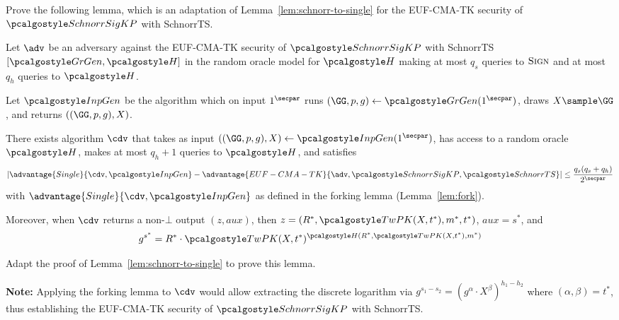 \begin{exercise}\label{ex:schnorrkp-to-single}
  Prove the following lemma, which is an adaptation of Lemma~\ref{lem:schnorr-to-single} for the EUF-CMA-TK security of $\algo{SchnorrSigKP}$ with SchnorrTS.
  
  \begin{lemma}\label{lem:schnorrkp-to-single}
    Let $\adv$ be an adversary against the EUF-CMA-TK security of $\algo{SchnorrSigKP}$ with SchnorrTS$[\grgen, \algo{H}]$ in the random oracle model for $\algo{H}$ making at most $q_s$ queries to ${\normalfont\textsc{Sign}}$ and at most $q_h$ queries to $\algo{H}$.
    
    Let $\algo{InpGen}$ be the algorithm which on input $1^\secpar$ runs $(\GG, p, g) \gets \grgen(1^\secpar)$, draws $X \sample \GG$, and returns $((\GG, p, g), X)$.
    
    There exists algorithm $\cdv$ that takes as input $(\gparam, X) \gets \algo{InpGen}(1^\secpar)$, has access to a random oracle $\algo{H}$, makes at most $q_h + 1$ queries to $\algo{H}$, and satisfies
    \[
      \left|\advantage{Single}{\cdv, \algo{InpGen}} - \advantage{EUF-CMA-TK}{\adv, \algo{SchnorrSigKP}, \algo{SchnorrTS}}\right| \leq \frac{q_s(q_s + q_h)}{2^\secpar}
    \]
    with $\advantage{Single}{\cdv, \algo{InpGen}}$ as defined in the forking lemma (Lemma~\ref{lem:fork}).
    
    Moreover, when $\cdv$ returns a non-$\bot$ output $(z, \mathit{aux})$, then $z = (R^*, \algo{TwPK}(X, t^*), m^*, t^*)$, $\mathit{aux} = s^*$, and
    \[
      g^{s^*} = R^* \cdot \algo{TwPK}(X, t^*)^{\algo{H}(R^*, \algo{TwPK}(X, t^*), m^*)}
    \]
  \end{lemma}
  
  Adapt the proof of Lemma~\ref{lem:schnorr-to-single} to prove this lemma.
  
  \textbf{Note:} Applying the forking lemma to $\cdv$ would allow extracting the discrete logarithm via $g^{s_1 - s_2} = (g^\alpha \cdot X^\beta)^{h_1 - h_2}$ where $(\alpha, \beta) = t^*$, thus establishing the EUF-CMA-TK security of $\algo{SchnorrSigKP}$ with SchnorrTS.
\end{exercise}


